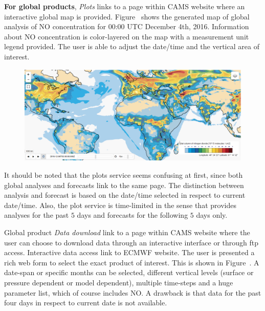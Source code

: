 \documentclass[9pt]{report}
\begin{document}
\noindent{}\textbf{For global products}, \emph{Plots} links to a page within CAMS website where an interactive global map is provided. 
Figure~ shows the generated map of global analysis of NO concentration for 00:00 UTC December 4th, 2016.
Information about NO concentration is color-layered on the map with a measurement unit legend provided.
The user is able to adjust the date/time and the vertical area of interest.%

\begin{figure}[h!]%
\begin{mdcenter}%

\noindent{}\includegraphics[keepaspectratio=true,width=\dimmin{}{\dimwidth{0.90}}]{images/global_map}{}%

\mdhr{}%

\noindent{}%
\end{mdcenter}\label{global-map}%
\end{figure}%

\noindent{}It should be noted that the plots service seems confusing at first, since both global analyses and forecasts link to the same page.
The distinction between analysis and forecast is based on the date/time selected in respect to current date/time.
Also, the plot service is time-limited in the sense that provides analyses for the past $5$ days and forecasts for the following $5$ days only.%

Global product \emph{Data download} link to a page within CAMS website where the user can choose to download data through an interactive interface or through ftp access.
Interactive data access link to ECMWF website. The user is presented a rich web form to select the exact product of interest. This is shown in Figure~.
A date-span or specific months can be selected, different vertical levels (surface or pressure dependent or model dependent), multiple time-steps and a huge parameter list, which of course includes NO.
A drawback is that data for the past four days in respect to current date is not available.%
\end{document}
